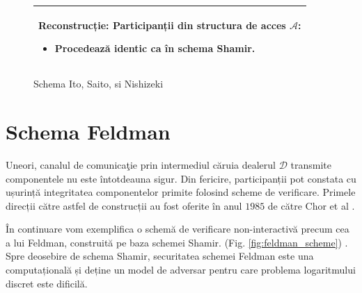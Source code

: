 \documentclass[oneside, 12pt]{book}
\begin{document}
\begin{figure}[h!]
\begin{tabular}{|p{\textwidth}|}
\hspace{.1in}
\textbf{Reconstrucție}: Participanții din structura de acces $\mathcal{A}$:
	\begin{itemize}
		\item Procedează identic ca în schema Shamir.
	\end{itemize}


\\
\hline
\end{tabular}

\caption{Schema Ito, Saito, si Nishizeki \cite{ITO:1989}}
\label{fig:ito_et_al}
\end{figure}



\section{Schema Feldman}
\label{sec:feldman_scheme}

Uneori, canalul de comunicaţie prin intermediul căruia dealerul $\mathcal{D}$ transmite componentele nu este întotdeauna sigur. Din fericire, participanții pot constata cu ușurință integritatea componentelor primite folosind scheme de verificare. Primele direcții către astfel de construcții au fost oferite în anul $1985$ de către Chor et al \cite{chor:1985verifiable}.

În continuare vom exemplifica o schemă de verificare non-interactivă precum cea a lui Feldman, construită pe baza schemei Shamir. (Fig. \ref{fig:feldman_scheme}) \cite{Feldman:1987}. Spre deosebire de schema Shamir, securitatea schemei Feldman este una computațională și deține un model de adversar pentru care problema logaritmului discret este dificilă.
\end{document}
